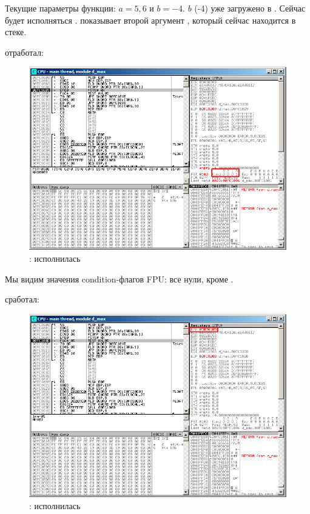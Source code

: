 Текущие параметры функции: $a=5,6$ и $b=-4$.
$b$ (-4) уже загружено в .
Сейчас будет исполняться \FCOMP. 
\olly показывает второй аргумент \FCOMP, который сейчас находится в стеке.


\clearpage
\FCOMP отработал:

\begin{figure}[H]
\centering
\includegraphics[scale=\FigScale]{patterns/12_FPU/3_comparison/x86/MSVC/olly2_2.png}
\caption{\olly: \FCOMP исполнилась}
\label{fig:FPU_comparison_case2_olly2}
\end{figure}

Мы видим значения condition-флагов \ac{FPU}: все нули, кроме \Czero.


\clearpage
\FNSTSW сработал:

\begin{figure}[H]
\centering
\includegraphics[scale=\FigScale]{patterns/12_FPU/3_comparison/x86/MSVC/olly2_3.png}
\caption{\olly: \FNSTSW исполнилась}
\label{fig:FPU_comparison_case2_olly3}
\end{figure}

